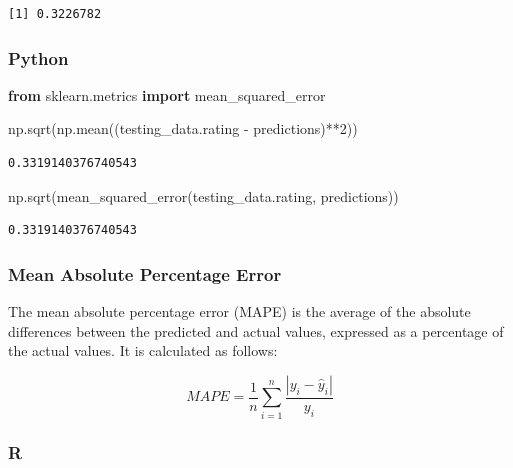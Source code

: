 \documentclass[
  letterpaper,
]{krantz}
\newenvironment{Shaded}{}{}
\newcommand{\DecValTok}[1]{\textcolor[rgb]{0.25,0.63,0.44}{#1}}
\newcommand{\FunctionTok}[1]{\textcolor[rgb]{0.02,0.16,0.49}{#1}}
\newcommand{\ImportTok}[1]{\textcolor[rgb]{0.00,0.50,0.00}{\textbf{#1}}}
\newcommand{\NormalTok}[1]{#1}
\newcommand{\OperatorTok}[1]{\textcolor[rgb]{0.40,0.40,0.40}{#1}}
\newcommand{\SpecialCharTok}[1]{\textcolor[rgb]{0.25,0.44,0.63}{#1}}
\begin{document}
\begin{verbatim}
[1] 0.3226782
\end{verbatim}

\subsubsection{Python}

\begin{Shaded}
\begin{Highlighting}[]
\ImportTok{from}\NormalTok{ sklearn.metrics }\ImportTok{import}\NormalTok{ mean\_squared\_error}

\NormalTok{np.sqrt(np.mean((testing\_data.rating }\OperatorTok{{-}}\NormalTok{ predictions)}\OperatorTok{**}\DecValTok{2}\NormalTok{))}
\end{Highlighting}
\end{Shaded}

\begin{verbatim}
0.3319140376740543
\end{verbatim}

\begin{Shaded}
\begin{Highlighting}[]
\NormalTok{np.sqrt(mean\_squared\_error(testing\_data.rating, predictions))}
\end{Highlighting}
\end{Shaded}

\begin{verbatim}
0.3319140376740543
\end{verbatim}

\subsubsection{Mean Absolute Percentage
Error}\label{mean-absolute-percentage-error}

The mean absolute percentage error (MAPE) is the average of the absolute
differences between the predicted and actual values, expressed as a
percentage of the actual values. It is calculated as follows:

\[MAPE = \frac{1}{n}\sum_{i=1}^{n}\frac{|y_i - \hat{y}_i|}{y_i}\]

\subsubsection{R}

\begin{Shaded}
\end{Shaded}
\end{document}
